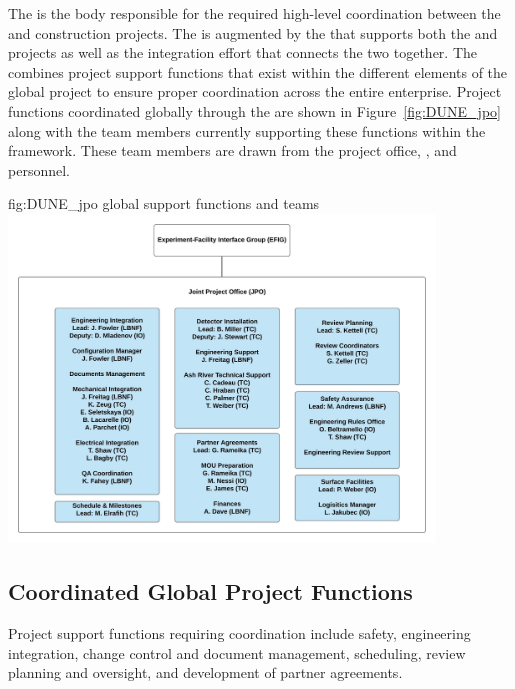 The  is the body responsible for the required high-level
coordination between the  and  construction 
projects. 
The  is augmented by the  that supports both 
the  and  projects as well as the integration
effort that connects the two together. The  combines
project support functions that exist within the different elements 
of the global project to ensure proper coordination across the entire 
 enterprise.  Project functions coordinated globally 
through the  are shown in Figure~\ref{fig:DUNE_jpo} along 
with the team members %
currently supporting these functions  %
within the  framework. 
These team members are drawn from the  project office,  , 
and   personnel.  
\begin{dunefigure}{fig:DUNE_jpo}
  { global support functions and teams}
  \includegraphics[width=0.85\textwidth]{graphics/JPO_OrgChart_v4}
\end{dunefigure}


\subsection{Coordinated Global Project Functions}

Project support functions requiring  coordination include
safety, engineering integration, change control and document 
management, scheduling, review planning and oversight, and development 
of partner agreements.  

